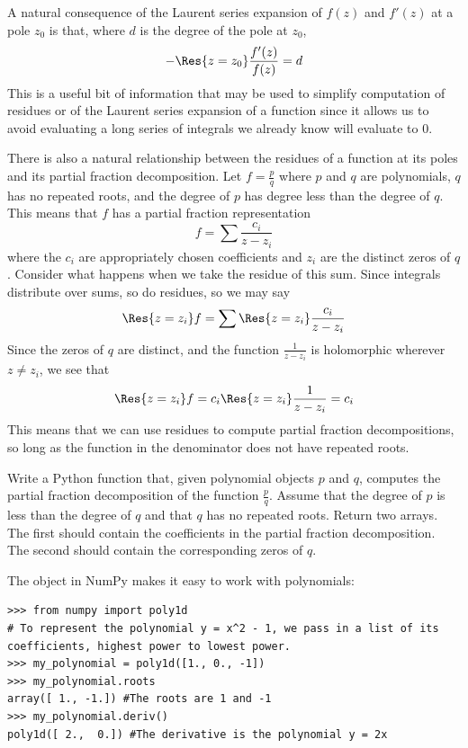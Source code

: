 A natural consequence of the Laurent series expansion of $f(z)$ and $f'(z)$ at a pole $z_0$ is that, where $d$ is the degree of the pole at $z_0$,
\[- \Res{z=z_0} \frac{f'(z)}{f(z)} = d\]
This is a useful bit of information that may be used to simplify computation of residues or of the Laurent series expansion of a function since it allows us to avoid evaluating a long series of integrals we already know will evaluate to $0$.

There is also a natural relationship between the residues of a function at its poles and its partial fraction decomposition.
Let $f = \frac{p}{q}$ where $p$ and $q$ are polynomials, $q$ has no repeated roots, and the degree of $p$ has degree less than the degree of $q$.
This means that $f$ has a partial fraction representation
\[f = \sum \frac{c_i}{z - z_i}\]
where the $c_i$ are appropriately chosen coefficients and $z_i$ are the distinct zeros of $q$.
Consider what happens when we take the residue of this sum.
Since integrals distribute over sums, so do residues, so we may say
\[\Res{z=z_i} f = \sum \Res{z=z_i} \frac{c_i}{z - z_i}\]
Since the zeros of $q$ are distinct, and the function $\frac{1}{z - z_i}$ is holomorphic wherever $z \neq z_i$, we see that
\[\Res{z=z_i} f = c_i \Res{z=z_i} \frac{1}{z-z_i} = c_i\]
This means that we can use residues to compute partial fraction decompositions, so long as the function in the denominator does not have repeated roots.

\begin{problem}
Write a Python function that, given polynomial objects $p$ and $q$, computes the partial fraction decomposition of the function $\frac{p}{q}$.
Assume that the degree of $p$ is less than the degree of $q$ and that $q$ has no repeated roots.
Return two arrays.
The first should contain the coefficients in the partial fraction decomposition.
The second should contain the corresponding zeros of $q$.

The  object in NumPy makes it easy to work with polynomials:
\begin{lstlisting}
>>> from numpy import poly1d
# To represent the polynomial y = x^2 - 1, we pass in a list of its coefficients, highest power to lowest power.
>>> my_polynomial = poly1d([1., 0., -1]) 
>>> my_polynomial.roots
array([ 1., -1.]) #The roots are 1 and -1
>>> my_polynomial.deriv()
poly1d([ 2.,  0.]) #The derivative is the polynomial y = 2x
\end{lstlisting}
\end{problem}


